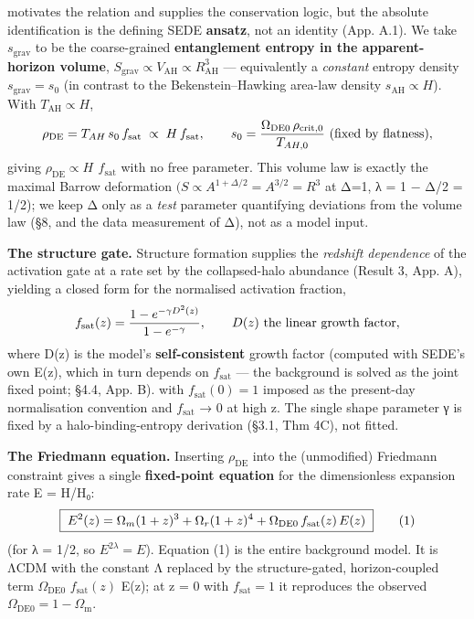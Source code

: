 \documentclass[
  10pt,
]{article}
\begin{document}
motivates the relation and supplies the conservation logic, but the
absolute identification is the defining SEDE \textbf{ansatz}, not an
identity (App. A.1). We take \(s_{\mathrm{grav}}\) to be the
coarse-grained \textbf{entanglement entropy in the apparent-horizon
volume},
\(S_{\mathrm{grav}} \propto  V_{\mathrm{AH}} \propto  R_{\mathrm{AH}}^{3}\)
--- equivalently a \emph{constant} entropy density
\(s_{\mathrm{grav}} = s_{0}\) (in contrast to the Bekenstein--Hawking
area-law density \(s_{\mathrm{AH}} \propto  H\)). With
\(T_{\mathrm{AH}} \propto  H\),
\[\rho_{\rm DE} = T_{AH}\,s_0\,f_{\rm sat} \;\propto\; H\,f_{\rm sat}, \qquad
s_0 = \frac{\Omega_{\rm DE0}\,\rho_{\rm crit,0}}{T_{AH,0}}\ \text{(fixed by flatness)},\]
giving \textbf{\(\rho _{\mathrm{DE}} \propto  H\) \(f_{\mathrm{sat}}\)}
with no free parameter. This volume law is exactly the maximal Barrow
deformation \((S \propto  A^{1+\Delta /2} = A^{3/2} = R^{3}\) at Δ=1, λ
= 1 − Δ/2 = 1/2); we keep Δ only as a \emph{test} parameter quantifying
deviations from the volume law (§8, and the data measurement of Δ), not
as a model input.

\textbf{The structure gate.} Structure formation supplies the
\emph{redshift dependence} of the activation gate at a rate set by the
collapsed-halo abundance (Result 3, App. A), yielding a closed form for
the normalised activation fraction,
\[f_{\rm sat}(z) = \frac{1 - e^{-\gamma D^2(z)}}{1 - e^{-\gamma}}, \qquad D(z)\ \text{the linear growth factor},\]
where D(z) is the model's \textbf{self-consistent} growth factor
(computed with SEDE's own E(z), which in turn depends on
\(f_{\mathrm{sat}}\) --- the background is solved as the joint fixed
point; §4.4, App. B). with \(f_{\mathrm{sat}}(0) = 1\) imposed as the
present-day normalisation convention and \(f_{\mathrm{sat}}\) → 0 at
high z. The single shape parameter γ is fixed by a halo-binding-entropy
derivation (§3.1, Thm 4C), not fitted.

\textbf{The Friedmann equation.} Inserting \(\rho _{\mathrm{DE}}\) into
the (unmodified) Friedmann constraint gives a single \textbf{fixed-point
equation} for the dimensionless expansion rate E = H/H₀:
\[\boxed{\;E^2(z) = \Omega_m(1+z)^3 + \Omega_r(1+z)^4 + \Omega_{\rm DE0}\, f_{\rm sat}(z)\, E(z)\;}\tag{1}\]
(for λ = 1/2, so \(E^{2\lambda } = E\)). Equation (1) is the entire
background model. It is ΛCDM with the constant Λ replaced by the
structure-gated, horizon-coupled term \(\Omega _{\mathrm{DE0}}\)
\(f_{\mathrm{sat}}(z)\) E(z); at z = 0 with \(f_{\mathrm{sat}} = 1\) it
reproduces the observed
\(\Omega _{\mathrm{DE0}} = 1 - \Omega _{\mathrm{m}}\).
\end{document}
